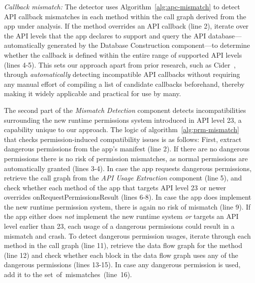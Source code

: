 \textit{Callback mismatch:} %
The detector uses Algorithm~\ref{alg:apc-mismatch} to detect API callback mismatches in each method within the call graph derived from the app under analysis.
If the method overrides an API callback
(line 2), iterate over the API levels that the app declares to support and query
the API database---automatically generated by the Database Construction
component---to determine whether the callback is defined within the entire range
of supported API levels (lines 4-5). This sets our approach apart from prior
research, such as {\sc Cider}~\cite{wu2017measuring}, through
\emph{automatically} detecting incompatible API callbacks without requiring any
manual effort of compiling a list of candidate callbacks beforehand, thereby
making it widely applicable and practical for use by many.





The second part of the \textit{Mismatch Detection} component detects
incompatibilities surrounding the new runtime permissions system introduced in
API level 23, a capability unique to our approach. %
The logic of algorithm~\ref{alg:prm-mismatch} that checks permission-induced compatibility issues is as follows:
First, extract dangerous permissions from the app's manifest (line 2).  If there are no
dangerous permissions there is no risk of permission mismatches,
as normal permissions are automatically granted (lines 3-4).  In case the app
requests dangerous permissions, retrieve the call graph from the \textit{API Usage
Extraction} component (line 5), and check whether each method of the app that
targets API level 23 or newer overrides {\sf onRequestPermissionsResult} (lines
6-8). In case the app does implement the new runtime permission system, there
is again no risk of mismatch (line 9).  If the app either does \emph{not} implement
the new runtime system \emph{or} targets an API level earlier than
23, each usage of a dangerous permissions could result in a mismatch and crash.
To detect dangerous permission usages, iterate through each method in the call
graph (line 11), retrieve the data flow graph for the method (line 12) and check
whether each block in the data flow graph uses any of the dangerous permissions
(lines 13-15). In case any dangerous permission is used, add it to the
set~of~mismatches~(line~16).




\begin{figure}[t]
        
        \vspace{-5ex}
\end{figure}



